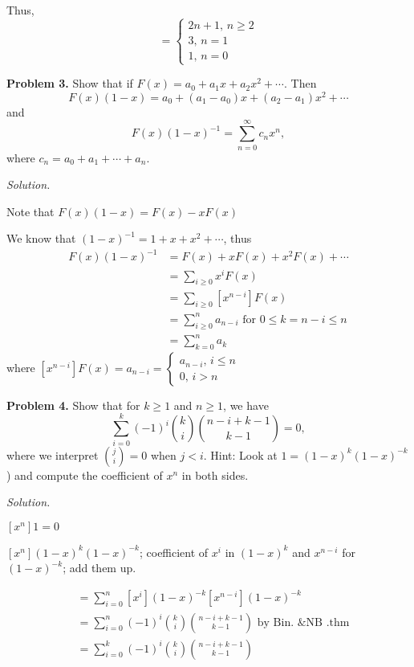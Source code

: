 Thus,
\[ =\begin{cases}
    2n+1,\,n\ge 2\\
    3,\,n=1\\
    1,\,n=0
\end{cases} \]

\textbf{Problem 3.} Show that if $ F(x)=a_0+a_1x+a_2x^2+\cdots $. Then
\[ F(x)(1-x)=a_0+(a_1-a_0)x+(a_2-a_1)x^2+\cdots \]
and
\[ F(x)(1-x)^{-1}=\sum\limits_{n=0}^{\infty} c_n x^n, \]
where $ c_n=a_0+a_1+\cdots+a_n $.

\emph{Solution.}

Note that $ F(x)(1-x)=F(x)-xF(x) $

We know that $ (1-x)^{-1}=1+x+x^2+\cdots $, thus
\begin{align*}
    F(x)(1-x)^{-1}&=
    F(x)+xF(x)+x^2F(x)+\cdots\\
    &=\sum\limits_{i\geq 0}x^{i} F(x)\\
    &=\sum\limits_{i\ge 0}[x^{n-i}] F(x)\\
    &=\sum\limits_{i\ge 0}^{n} a_{n-i} \text{ for } 0\leq k=n-i\leq n\\
    &=\sum\limits_{k=0}^{n} a_k 
\end{align*}
where $ [x^{n-i}]F(x)=a_{n-i}=\begin{cases}
    a_{n-i},\,i\leq n\\
    0,\,i>n
\end{cases} $

\textbf{Problem 4.} Show that for $ k\ge 1 $ and $ n\ge 1 $, we have
\[ \sum\limits_{i=0}^{k} (-1)^i\binom{k}{i}\binom{n-i+k-1}{k-1}=0, \]
where we interpret $ \binom{j}{i}=0 $ when $ j<i $. 
Hint: Look at $ 1=(1-x)^{k}(1-x)^{-k} $) and compute the coefficient of $ x^n $
in both sides.

\emph{Solution.}

$ [x^n]1=0 $

$ [x^n](1-x)^k(1-x)^{-k} $;
coefficient of $ x^i $ in $ (1-x)^k $ and $ x^{n-i} $ for $ (1-x)^{-k} $;
add them up.

\begin{align*}
    &=\sum\limits_{i=0}^{n} [x^i](1-x)^{-k}[x^{n-i}](1-x)^{-k}\\
    &=\sum\limits_{i=0}^{n} (-1)^{i}\binom{k}{i}\binom{n-i+k-1}{k-1}
    \text{ by Bin. \& NB .thm}\\
    &=\sum\limits_{i=0}^{k} (-1)^i\binom{k}{i}\binom{n-i+k-1}{k-1}
\end{align*}


